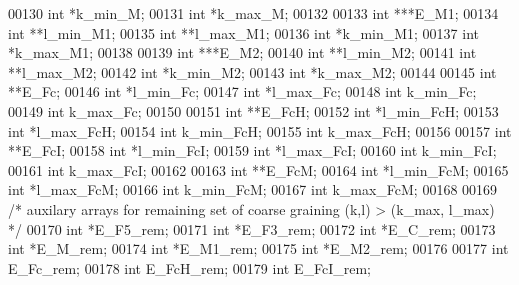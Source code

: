 \begin{DoxyCode}
00130   \textcolor{keywordtype}{int}           *k\_min\_M;
00131   \textcolor{keywordtype}{int}           *k\_max\_M;
00132 
00133   \textcolor{keywordtype}{int}           ***E\_M1;
00134   \textcolor{keywordtype}{int}           **l\_min\_M1;
00135   \textcolor{keywordtype}{int}           **l\_max\_M1;
00136   \textcolor{keywordtype}{int}           *k\_min\_M1;
00137   \textcolor{keywordtype}{int}           *k\_max\_M1;
00138 
00139   \textcolor{keywordtype}{int}           ***E\_M2;
00140   \textcolor{keywordtype}{int}           **l\_min\_M2;
00141   \textcolor{keywordtype}{int}           **l\_max\_M2;
00142   \textcolor{keywordtype}{int}           *k\_min\_M2;
00143   \textcolor{keywordtype}{int}           *k\_max\_M2;
00144 
00145   \textcolor{keywordtype}{int}           **E\_Fc;
00146   \textcolor{keywordtype}{int}           *l\_min\_Fc;
00147   \textcolor{keywordtype}{int}           *l\_max\_Fc;
00148   \textcolor{keywordtype}{int}           k\_min\_Fc;
00149   \textcolor{keywordtype}{int}           k\_max\_Fc;
00150 
00151   \textcolor{keywordtype}{int}           **E\_FcH;
00152   \textcolor{keywordtype}{int}           *l\_min\_FcH;
00153   \textcolor{keywordtype}{int}           *l\_max\_FcH;
00154   \textcolor{keywordtype}{int}           k\_min\_FcH;
00155   \textcolor{keywordtype}{int}           k\_max\_FcH;
00156 
00157   \textcolor{keywordtype}{int}           **E\_FcI;
00158   \textcolor{keywordtype}{int}           *l\_min\_FcI;
00159   \textcolor{keywordtype}{int}           *l\_max\_FcI;
00160   \textcolor{keywordtype}{int}           k\_min\_FcI;
00161   \textcolor{keywordtype}{int}           k\_max\_FcI;
00162 
00163   \textcolor{keywordtype}{int}           **E\_FcM;
00164   \textcolor{keywordtype}{int}           *l\_min\_FcM;
00165   \textcolor{keywordtype}{int}           *l\_max\_FcM;
00166   \textcolor{keywordtype}{int}           k\_min\_FcM;
00167   \textcolor{keywordtype}{int}           k\_max\_FcM;
00168 
00169   \textcolor{comment}{/* auxilary arrays for remaining set of coarse graining (k,l) > (k\_max, l\_max) */}
00170   \textcolor{keywordtype}{int}           *E\_F5\_rem;
00171   \textcolor{keywordtype}{int}           *E\_F3\_rem;
00172   \textcolor{keywordtype}{int}           *E\_C\_rem;
00173   \textcolor{keywordtype}{int}           *E\_M\_rem;
00174   \textcolor{keywordtype}{int}           *E\_M1\_rem;
00175   \textcolor{keywordtype}{int}           *E\_M2\_rem;
00176 
00177   \textcolor{keywordtype}{int}           E\_Fc\_rem;
00178   \textcolor{keywordtype}{int}           E\_FcH\_rem;
00179   \textcolor{keywordtype}{int}           E\_FcI\_rem;

\end{DoxyCode}
